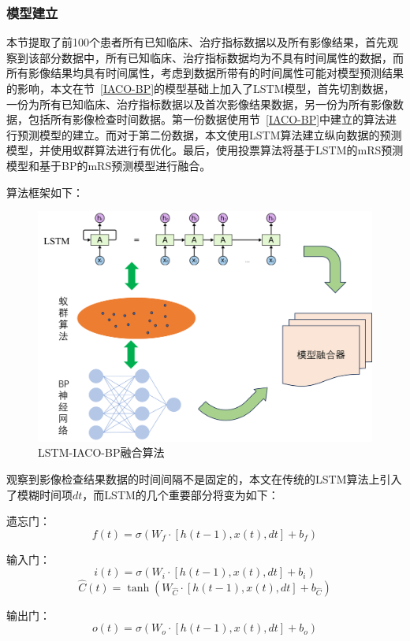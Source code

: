 \documentclass[bwprint]{gmcmthesis}
\begin{document}
\subsubsection{模型建立}
本节提取了前100个患者所有已知临床、治疗指标数据以及所有影像结果，首先观察到该部分数据中，所有已知临床、治疗指标数据均为不具有时间属性的数据，而所有影像结果均具有时间属性，考虑到数据所带有的时间属性可能对模型预测结果的影响，本文在节~\ref{IACO-BP}的模型基础上加入了LSTM模型，首先切割数据，一份为所有已知临床、治疗指标数据以及首次影像结果数据，另一份为所有影像数据，包括所有影像检查时间数据。第一份数据使用节~\ref{IACO-BP}中建立的算法进行预测模型的建立。而对于第二份数据，本文使用LSTM算法建立纵向数据的预测模型，并使用蚁群算法进行有优化。最后，使用投票算法将基于LSTM的mRS预测模型和基于BP的mRS预测模型进行融合。

算法框架如下：
\begin{figure}[h] %
  \centering %
  \includegraphics[width=.7\textwidth]{fig_me/融合模型.png}
  \caption{LSTM-IACO-BP融合算法}
  \label{LSTM-IACO-BP融合算法}
\end{figure}

观察到影像检查结果数据的时间间隔不是固定的，本文在传统的LSTM算法上引入了模糊时间项$dt$，而LSTM的几个重要部分将变为如下：

遗忘门：
\begin{equation}
f(t) = \sigma(W_f \cdot [h(t-1), x(t), dt] + b_f)
\end{equation}

输入门：
\begin{equation}
i(t) = \sigma(W_i \cdot [h(t-1), x(t), dt] + b_i)
\end{equation}
\begin{equation}
\hat{C}(t) = \tanh(W_{\hat{C}} \cdot [h(t-1), x(t), dt] + b_{\hat{C}})
\end{equation}

输出门：
\begin{equation}
o(t) = \sigma(W_o \cdot [h(t-1), x(t), dt] + b_o)
\end{equation}
\end{document}
